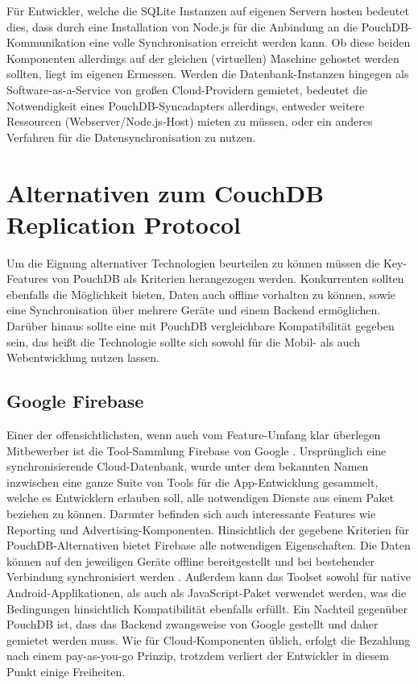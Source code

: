 Für Entwickler, welche die SQLite Instanzen auf eigenen Servern hosten bedeutet dies, dass durch eine Installation von Node.js für die Anbindung an die PouchDB-Kommunikation eine volle Synchronisation erreicht werden kann. Ob diese beiden Komponenten allerdings auf der gleichen (virtuellen) Maschine gehostet werden sollten, liegt im eigenen Ermessen. Werden die Datenbank-Instanzen hingegen als Software-as-a-Service von großen Cloud-Providern gemietet, bedeutet die Notwendigkeit eines PouchDB-Syncadapters allerdings, entweder weitere Ressourcen (Webserver/Node.js-Host) mieten zu müssen, oder ein anderes Verfahren für die Datensynchronisation zu nutzen.

\section{Alternativen zum CouchDB Replication Protocol}
Um die Eignung alternativer Technologien beurteilen zu können müssen die Key-Features von PouchDB als Kriterien herangezogen werden. Konkurrenten sollten ebenfalls die Möglichkeit bieten, Daten auch offline vorhalten zu können, sowie eine Synchronisation über mehrere Geräte und einem Backend ermöglichen. Darüber hinaus sollte eine mit PouchDB vergleichbare Kompatibilität gegeben sein, das heißt die Technologie sollte sich sowohl für die Mobil- als auch Webentwicklung nutzen lassen.

\subsection{Google Firebase}
Einer der offensichtlichsten, wenn auch vom Feature-Umfang klar überlegen Mitbewerber ist die Tool-Sammlung Firebase von Google \cite{google:firebase}. Ursprünglich eine synchronisierende Cloud-Datenbank, wurde unter dem bekannten Namen inzwischen eine ganze Suite von Tools für die App-Entwicklung gesammelt, welche es Entwicklern erlauben soll, alle notwendigen Dienste aus einem Paket beziehen zu können. Darunter befinden sich auch interessante Features wie Reporting und Advertising-Komponenten. Hinsichtlich der gegebene Kriterien für PouchDB-Alternativen bietet Firebase alle notwendigen Eigenschaften. Die Daten können auf den jeweiligen Geräte offline bereitgestellt und bei bestehender Verbindung synchronisiert werden \cite{google:offlinejs}\cite{google:offlineandroid}. Außerdem kann das Toolset sowohl für native Android-Applikationen, als auch als JavaScript-Paket verwendet werden, was die Bedingungen hinsichtlich Kompatibilität ebenfalls erfüllt. Ein Nachteil gegenüber PouchDB ist, dass das Backend zwangsweise von Google gestellt und daher gemietet werden muss. Wie für Cloud-Komponenten üblich, erfolgt die Bezahlung nach einem pay-as-you-go Prinzip, trotzdem verliert der Entwickler in diesem Punkt einige Freiheiten.

